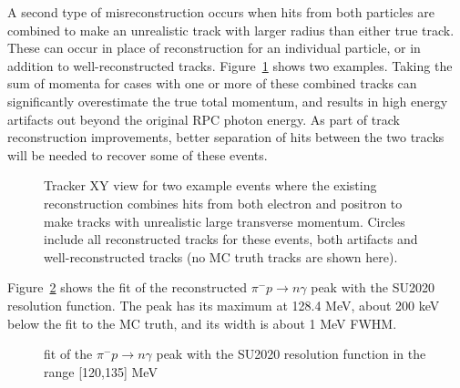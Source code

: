 A second type of misreconstruction occurs when hits from both particles are combined to make an unrealistic track with larger radius than either true track. These can occur in place of reconstruction for an individual particle, or in addition to well-reconstructed tracks. Figure~\ref{figure:he_artifact_evts} shows two examples. Taking the sum of momenta for cases with one or more of these combined tracks can significantly overestimate the true total momentum, and results in high energy artifacts out beyond the original RPC photon energy. As part of track reconstruction improvements, better separation of hits between the two tracks will be needed to recover some of these events. 

\begin{figure}[H]
  \caption{
    \label{figure:he_artifact_evts}
    Tracker XY view for two example events where the existing
    reconstruction combines hits from both electron and positron to
    make tracks with unrealistic large transverse momentum. Circles
    include all reconstructed tracks for these events, both artifacts
    and well-reconstructed tracks (no MC truth tracks are shown here).
  }
\end{figure}

Figure~\ref{figure:00085_t2_1_smom_1_fit} shows the fit of the
reconstructed $\pi^- p \to n \gamma$ peak with the SU2020 resolution function.
The peak has its maximum at 128.4 MeV, about 200 keV below the fit to the MC truth,
and its width is about 1 MeV FWHM. 

\begin{figure}[H]
  \caption{
    \label{figure:00085_t2_1_smom_1_fit}
    fit of the $\pi^- p \to n \gamma$ peak with the SU2020 resolution function
    in the range [120,135] MeV
  }
\end{figure}

